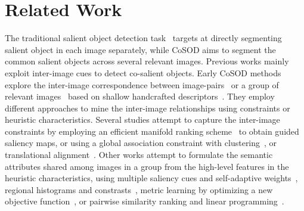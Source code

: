 \documentclass[final]{cvpr}
\begin{document}
\section{Related Work}



The traditional salient object detection task~\cite{qin2019basnet,liu2019simple,zhao2019egnet,GaoEccv20Sal100K,zhao2019optimizing} targets at directly segmenting salient object in each image separately, while CoSOD aims to segment the common salient objects across several relevant images. Previous works mainly exploit inter-image cues to detect co-salient objects. Early CoSOD methods explore the inter-image correspondence between image-pairs~\cite{li2011co,chen2010preattentive} or a group of relevant images~\cite{cao2014co} based on shallow handcrafted descriptors~\cite{jerripothula2016cats,chang2011co}. They employ different approaches to mine the inter-image relationships using constraints or heuristic characteristics.
Several studies attempt to capture the inter-image constraints by employing an efficient manifold ranking scheme~\cite{li2014efficient} to obtain guided saliency maps, or using a global
association constraint with clustering~\cite{fu2013cluster}, or translational alignment~\cite{jacobs2010cosaliency}.
Other works attempt to formulate the semantic attributes shared among images in a group from the high-level features in the heuristic characteristics, using  multiple saliency cues and self-adaptive weights~\cite{cao2014self}, regional histograms and constrasts~\cite{liu2013co}, metric learning by optimizing a new objective function~\cite{han2017unified}, or pairwise similarity ranking and linear programming~\cite{li2013co}.
\end{document}
